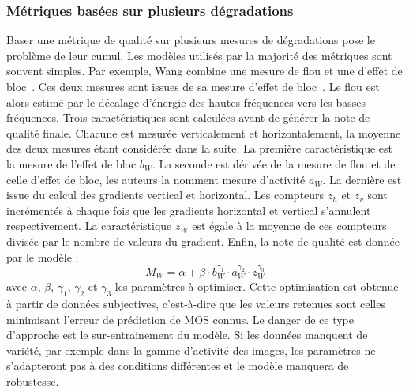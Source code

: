 \subsubsection{Métriques basées sur plusieurs dégradations}
Baser une métrique de qualité sur plusieurs mesures de dégradations pose le problème de leur cumul. Les modèles utilisés par la majorité des métriques sont souvent simples. Par exemple, Wang combine une mesure de flou et une d'effet de bloc~\cite{wang-icip2002}. Ces deux mesures sont issues de sa mesure d'effet de bloc~\cite{wang-icip2000}. Le flou est alors estimé par le décalage d'énergie des hautes fréquences vers les basses fréquences. Trois caractéristiques sont calculées avant de générer la note de qualité finale. Chacune est mesurée verticalement et horizontalement, la moyenne des deux mesures étant considérée dans la suite. La première caractéristique est la mesure de l'effet de bloc $b_W$. La seconde est dérivée de la mesure de flou et de celle d'effet de bloc, les auteurs la nomment mesure d'activité $a_W$. La dernière est issue du calcul des gradients vertical et horizontal. Les compteurs $z_h$ et $z_v$ sont incrémentés à chaque fois que les gradients horizontal et vertical s'annulent respectivement. La caractéristique $z_W$ est égale à la moyenne de ces compteurs divisée par le nombre de valeurs du gradient. Enfin, la note de qualité est donnée par le modèle :
\begin{equation}
M_W = \alpha + \beta\cdot b_W^{\gamma_1}\cdot a_W^{\gamma_2}\cdot z_W^{\gamma_3}
\end{equation}
%
avec $\alpha$, $\beta$, $\gamma_1$, $\gamma_2$ et $\gamma_3$ les paramètres à optimiser. Cette optimisation est obtenue à partir de données subjectives, c'est-à-dire que les valeurs retenues sont celles minimisant l'erreur de prédiction de MOS connus. Le danger de ce type d'approche est le sur-entrainement du modèle. Si les données manquent de variété, par exemple dans la gamme d'activité des images, les paramètres ne s'adapteront pas à des conditions différentes et le modèle manquera de robustesse.


